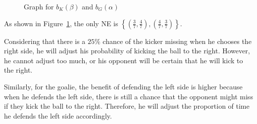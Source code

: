 \documentclass{article}
\begin{document}
    \begin{figure}[t]
    \centering
        \caption{Graph for $b_K(\beta)$ and $b_G(\alpha)$}
        \label{fig:best_response_1_2}
    \end{figure}

    As shown in Figure~\ref{fig:best_response_1_2}, the only NE is $\left\{\left(\frac{3}{7}, \frac{4}{7}\right), \left(\frac{4}{7}, \frac{3}{7}\right)\right\}$.

    Considering that there is a $25\%$ chance of the kicker missing when he chooses the right side, he will adjust his probability of kicking the ball to the right. However, he cannot adjust too much, or his opponent will be certain that he will kick to the right.

    Similarly, for the goalie, the benefit of defending the left side is higher because when he defends the left side, there is still a chance that the opponent might miss if they kick the ball to the right. Therefore, he will adjust the proportion of time he defends the left side accordingly.
\end{document}
